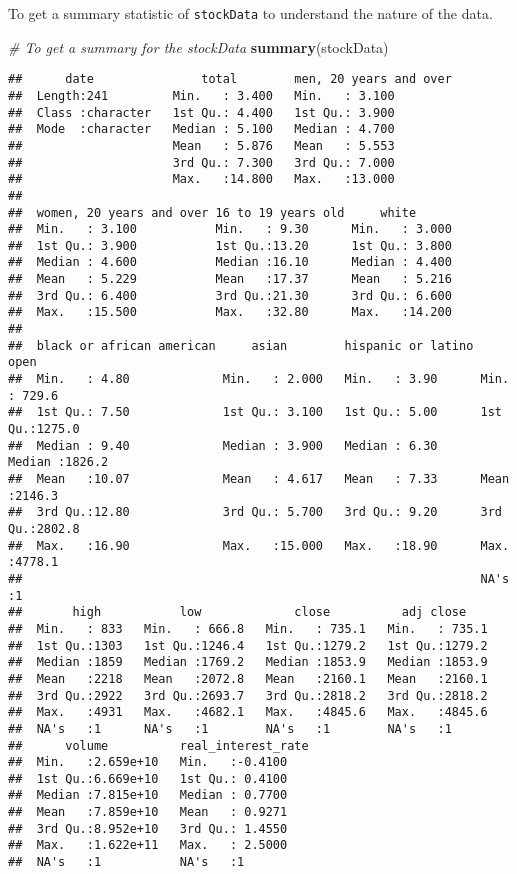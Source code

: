 \documentclass[
]{article}
\newenvironment{Shaded}{\begin{snugshade}}{\end{snugshade}}
\newcommand{\CommentTok}[1]{\textcolor[rgb]{0.56,0.35,0.01}{\textit{#1}}}
\newcommand{\FunctionTok}[1]{\textcolor[rgb]{0.13,0.29,0.53}{\textbf{#1}}}
\newcommand{\NormalTok}[1]{#1}
\begin{document}
To get a summary statistic of \texttt{stockData} to understand the
nature of the data.

\begin{Shaded}
\begin{Highlighting}[]
\CommentTok{\# To get a summary for the stockData}
\FunctionTok{summary}\NormalTok{(stockData)}
\end{Highlighting}
\end{Shaded}

\begin{verbatim}
##      date               total        men, 20 years and over
##  Length:241         Min.   : 3.400   Min.   : 3.100        
##  Class :character   1st Qu.: 4.400   1st Qu.: 3.900        
##  Mode  :character   Median : 5.100   Median : 4.700        
##                     Mean   : 5.876   Mean   : 5.553        
##                     3rd Qu.: 7.300   3rd Qu.: 7.000        
##                     Max.   :14.800   Max.   :13.000        
##                                                            
##  women, 20 years and over 16 to 19 years old     white       
##  Min.   : 3.100           Min.   : 9.30      Min.   : 3.000  
##  1st Qu.: 3.900           1st Qu.:13.20      1st Qu.: 3.800  
##  Median : 4.600           Median :16.10      Median : 4.400  
##  Mean   : 5.229           Mean   :17.37      Mean   : 5.216  
##  3rd Qu.: 6.400           3rd Qu.:21.30      3rd Qu.: 6.600  
##  Max.   :15.500           Max.   :32.80      Max.   :14.200  
##                                                              
##  black or african american     asian        hispanic or latino      open       
##  Min.   : 4.80             Min.   : 2.000   Min.   : 3.90      Min.   : 729.6  
##  1st Qu.: 7.50             1st Qu.: 3.100   1st Qu.: 5.00      1st Qu.:1275.0  
##  Median : 9.40             Median : 3.900   Median : 6.30      Median :1826.2  
##  Mean   :10.07             Mean   : 4.617   Mean   : 7.33      Mean   :2146.3  
##  3rd Qu.:12.80             3rd Qu.: 5.700   3rd Qu.: 9.20      3rd Qu.:2802.8  
##  Max.   :16.90             Max.   :15.000   Max.   :18.90      Max.   :4778.1  
##                                                                NA's   :1       
##       high           low             close          adj close     
##  Min.   : 833   Min.   : 666.8   Min.   : 735.1   Min.   : 735.1  
##  1st Qu.:1303   1st Qu.:1246.4   1st Qu.:1279.2   1st Qu.:1279.2  
##  Median :1859   Median :1769.2   Median :1853.9   Median :1853.9  
##  Mean   :2218   Mean   :2072.8   Mean   :2160.1   Mean   :2160.1  
##  3rd Qu.:2922   3rd Qu.:2693.7   3rd Qu.:2818.2   3rd Qu.:2818.2  
##  Max.   :4931   Max.   :4682.1   Max.   :4845.6   Max.   :4845.6  
##  NA's   :1      NA's   :1        NA's   :1        NA's   :1       
##      volume          real_interest_rate
##  Min.   :2.659e+10   Min.   :-0.4100   
##  1st Qu.:6.669e+10   1st Qu.: 0.4100   
##  Median :7.815e+10   Median : 0.7700   
##  Mean   :7.859e+10   Mean   : 0.9271   
##  3rd Qu.:8.952e+10   3rd Qu.: 1.4550   
##  Max.   :1.622e+11   Max.   : 2.5000   
##  NA's   :1           NA's   :1
\end{verbatim}
\end{document}
